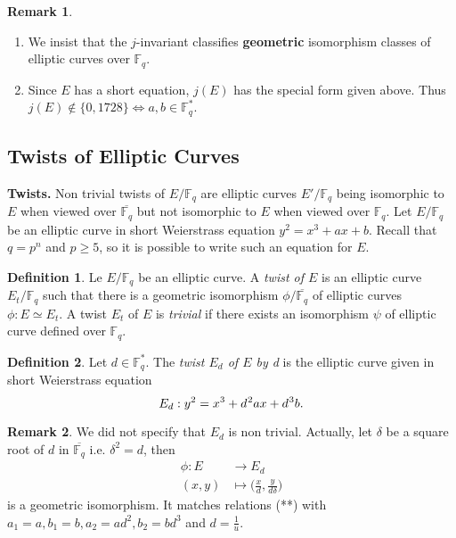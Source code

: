 \documentclass[10pt]{article}
\theoremstyle{definition}
\newtheorem{definition}{Definition}
\newtheorem{remark}{Remark}
\newcommand{\F}{\mathbb{F}}
\begin{document}
\noindent \begin{remark}
\begin{enumerate}
\item We insist that the $j$-invariant classifies \textbf{geometric} isomorphism classes of elliptic curves over $\F_q$. 
\item Since $E$ has a short equation, $j(E)$ has the special form given above.
Thus $j(E) \notin \lbrace 0, 1728 \rbrace \Leftrightarrow a,b \in \F_q^{*}$.
\end{enumerate}
\end{remark}

\subsection{Twists of Elliptic Curves}

\noindent \textbf{Twists.} Non trivial twists of $E/\F_q$ are elliptic curves $E'/\F_q$ being isomorphic to $E$ when viewed over $\overline{\F_q}$ but not isomorphic to $E$ when viewed over $\F_q$.
Let $E/\F_q$ be an elliptic curve in short Weierstrass equation $y^2 = x^3+ax+b$.
Recall that $q = p^n$ and $p \geq 5$, so it is possible to write such an equation for $E$. 

\begin{definition}
Le $E/\F_q$ be an elliptic curve.
A \textsl{twist of $E$} is an elliptic curve $E_t/\F_q$ such that there is a geometric isomorphism $\phi/\overline{\F_q}$ of elliptic curves $\phi : E \simeq E_t$.
A twist $E_t$ of $E$ is \textsl{trivial} if there exists an isomorphism $\psi$ of elliptic curve defined over $\F_q$.
\end{definition}

\begin{definition}
Let $d \in \F_q^*$.
The \textsl{twist $E_d$ of $E$ by d} is the elliptic curve given in short Weierstrass equation
\[ E_d : y^2 = x^3 + d^{\mkern1mu 2}ax + d^{\mkern1mu 3}b.\]
\end{definition}

\begin{remark}
We did not specify that $E_d$ is non trivial.
Actually, let $\delta$ be a square root of $d$ in $\overline{\F_q}$ i.e. $\delta^2 = d$, then
\begin{align*}
\phi : E & \to E_d\\
      (x,y)& \mapsto \big(\frac{x}{d},\frac{y}{d\delta}\big)
\end{align*}
is a geometric isomorphism. 
It matches relations (**) with $a_1=a, b_1=b, a_2 = ad^2, b_2=bd^3$ and $d = \frac1u$.
\end{remark}
\end{document}
